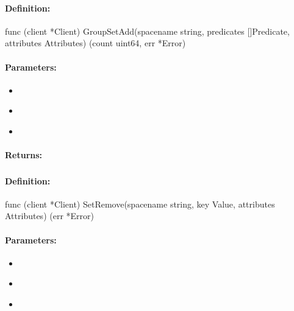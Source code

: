\paragraph{Definition:}
\begin{gocode}
func (client *Client) GroupSetAdd(spacename string, predicates []Predicate, attributes Attributes) (count uint64, err *Error)
\end{gocode}

\paragraph{Parameters:}
\begin{itemize}[noitemsep]
\item {}\\

\item {}\\

\item {}\\

\end{itemize}

\paragraph{Returns:}


\pagebreak
\subsubsection{}
\label{api:Go:SetRemove}


\paragraph{Definition:}
\begin{gocode}
func (client *Client) SetRemove(spacename string, key Value, attributes Attributes) (err *Error)
\end{gocode}

\paragraph{Parameters:}
\begin{itemize}[noitemsep]
\item {}\\

\item {}\\

\item {}\\

\end{itemize}

